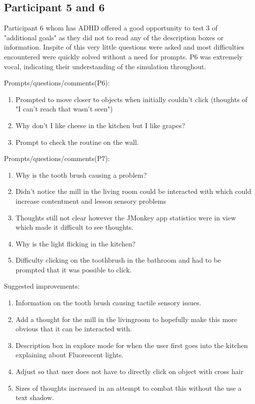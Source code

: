 \subsection*{Participant 5 and 6}

Participant 6 whom has ADHD offered a good opportunity to test 3 of "additional goals" as they did not to read any of the description boxes or information. Inspite of this very little questions were asked and most difficulties encountered were quickly solved without a need for prompts. P6 was extremely vocal, indicating their understanding of the simulation throughout.

Prompts/questions/comments(P6):
\begin{enumerate}
\item Prompted to move closer to objects when initially couldn't click (thoughts of "I can't reach that wasn't seen")
\item Why don't I like cheese in the kitchen but I like grapes?
\item Prompt to check the routine on the wall.
\end{enumerate}

Prompts/questions/comments(P7):
\begin{enumerate}
\item Why is the tooth brush causing a problem?
\item Didn't notice the mill in the living room could be interacted with which could increase contentment and lesson sensory problems
\item Thoughts still not clear however the JMonkey app statistics were in view which made it difficult to see thoughts.
\item Why is the light flicking in the kitchen?
\item Difficulty clicking on the toothbrush in the bathroom and had to be prompted that it was possible to click.
\end{enumerate}

Suggested improvements:
\begin{enumerate}
\item Information on the tooth brush causing tactile sensory issues. 
\item Add a thought for the mill in the livingroom to hopefully make this more obvious that it can be interacted with. 
\item Description box in explore mode for when the user first goes into the kitchen explaining about Fluorescent lights. 
\item Adjust so that user does not have to directly click on object with cross hair
\item Sizes of thoughts increased in an attempt to combat this without the use a text shadow. 
\end{enumerate}

